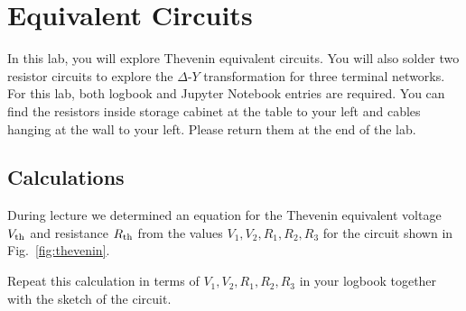 
\chapter{Equivalent Circuits}

In this lab, you will explore Thevenin equivalent circuits. You will
also solder two resistor circuits to explore the $\Delta$-$Y$
transformation for three terminal networks. For this lab, both logbook
and Jupyter Notebook entries are required. You can find the resistors
inside storage cabinet at the table to your left and cables hanging at
the wall to your left. Please return them at the end of the lab.

\section{Calculations}

\noindent
During lecture we determined an equation for the Thevenin
equivalent voltage $V_{\rm th}$ and resistance $R_{\rm th}$ from the
values $V_1, V_2, R_1, R_2, R_3$ for the circuit shown in
Fig.~\ref{fig:thevenin}.

\begin{measurement} 
Repeat this calculation in terms of $V_1, V_2, R_1, R_2, R_3$ in your
logbook together with the sketch of the circuit.
\end{measurement}

